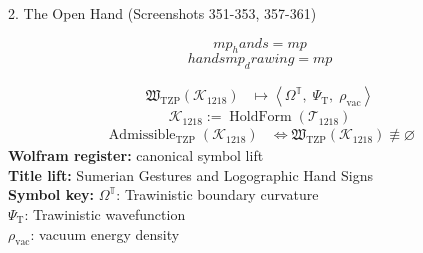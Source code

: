 
\begin{tzpsnapshot}
\end{tzpsnapshot}

2. The Open Hand (Screenshots 351-353, 357-361)

\[
mp_hands = mp
\]
\[
hands mp_drawing = mp
\]

\noindent
\begin{minipage}[t]{0.48\linewidth}
\begingroup
\small
\[
\begin{aligned}
\mathfrak{W}_{\mathrm{TZP}}\!\left(\mathcal{K}_{1218}\right)
&\longmapsto
\left\langle \Omega^{\mathbb{T}},\; \Psi_{\mathrm{T}},\; \rho_{\mathrm{vac}} \right\rangle
\end{aligned}
\]
\[
\mathcal{K}_{1218}
:=
\operatorname{HoldForm}\!\left(\mathcal{T}_{1218}\right)
\]
\[
\begin{aligned}
\operatorname{Admissible}_{\mathrm{TZP}}\!\left(\mathcal{K}_{1218}\right)
&\Longleftrightarrow
\mathfrak{W}_{\mathrm{TZP}}\!\left(\mathcal{K}_{1218}\right)\not\equiv\varnothing
\end{aligned}
\]
\textbf{Wolfram register:} canonical symbol lift\\
\textbf{Title lift:} Sumerian Gestures and Logographic Hand Signs\\
\textbf{Symbol key:} \(\Omega^{\mathbb{T}}\): Trawinistic boundary curvature\\ \(\Psi_{\mathrm{T}}\): Trawinistic wavefunction\\ \(\rho_{\mathrm{vac}}\): vacuum energy density
\par
\endgroup
\end{minipage}\hfill
